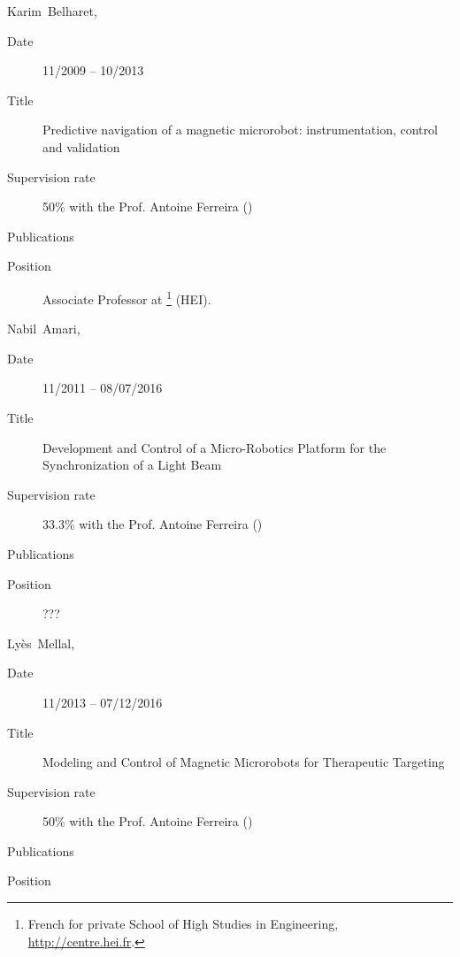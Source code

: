 \begin{CVlist}[label={[SUP\arabic*]}]
  \LoadOrder
  \item{}\textsf{Karim~Belharet}, 
  \begin{description}
    \item[Date] 11/2009 -- 10/2013
    \item[Title] Predictive navigation of a magnetic microrobot:    instrumentation, control and validation
    \item[Supervision rate] 50\% with the Prof. Antoine Ferreira (\INSA \CVL)
    \item[Publications] \cite{2010_biorob_belharet,2010_iros_belharet,2010_mitat_belharet,2011_advrob_belharet,2012_book_belharet,2012_iros_belhharet,2012_isot_belharet,2013_isot_belharet,2013_tbme_folio,2014_icra_belharet,2014_iros_belharet}
    \item[Position] Associate Professor at \footnote{French for private School of High Studies in Engineering, \url{http://centre.hei.fr}.} (HEI).
  \end{description}
  
  \medskip
  \item{}\textsf{Nabil~Amari}, 
  \begin{description}
    \item[Date] 11/2011 -- 08/07/2016
    \item[Title] Development  and Control of a Micro-Robotics Platform for the Synchronization of  a Light Beam
    \item[Supervision rate] 33.3\% with the Prof. Antoine Ferreira (\INSA \CVL)
    \item[Publications] \cite{2013_iros_amari,2013_isot_amari,2014_acc_amari,2014_ijo_amari,2014_iros_amari,encyclo_2016_amari}
    \item[Position] ???
  \end{description}
  
  \medskip
  \item{}\textsf{Lyès~Mellal}, 
  \begin{description}
    \item[Date] 11/2013 -- 07/12/2016
    \item[Title] Modeling and Control of Magnetic Microrobots for Therapeutic  Targeting
    \item[Supervision rate] 50\% with the Prof. Antoine Ferreira (\INSA \CVL)
    \item[Publications] \cite{2015_jnr_lyes,2015_com_mellal,2015_iros_mellal,2016_icra_mellal,2016_com_mellal,2016_marss_mellal,2016_tnb_lyes,2017_marss_mellal}
    \item[Position] 
  \end{description}
  \SaveOrder
\end{CVlist}

